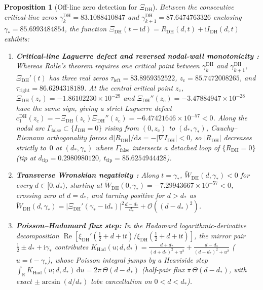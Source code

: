\documentclass[11pt,reqno]{amsart}
\newtheorem{proposition}[theorem]{Proposition}
\theoremstyle{definition}
\theoremstyle{remark}
\numberwithin{equation}{section}
\newcommand{\R}{\mathbb{R}}
\newcommand{\dd}{\mathrm{d}}
\newcommand{\ii}{\mathrm{i}}
\DeclareMathOperator{\Reop}{Re}
\begin{document}
\begin{proposition}[Off-line zero detection for $\Xi_{\mathrm{DH}}$]
\label{prop:fourfold-diagnostics}
Between the consecutive critical-line zeros $\gamma_k^{\mathrm{DH}} = 83.1088410847$ and $\gamma_{k+1}^{\mathrm{DH}} = 87.6474763326$ enclosing $\gamma_* = 85.6993484854$, the function $\Xi_{\mathrm{DH}}(t - \ii d) = R_{\mathrm{DH}}(d,t) + \ii I_{\mathrm{DH}}(d,t)$ exhibits:
\begin{enumerate}[label=\textup{(\roman*)},leftmargin=2.2em]
  \item \textbf{Critical-line Laguerre defect and reversed nodal-wall monotonicity \cite{jensen1913,csordas1994,ariasdereyna2003}:} Whereas Rolle's theorem requires one critical point between $\gamma_k^{\mathrm{DH}}$ and $\gamma_{k+1}^{\mathrm{DH}}$, $\Xi_{\mathrm{DH}}'(t)$ has \emph{three} real zeros $\tau_{\mathrm{left}} = 83.8959352522$, $z_{\mathrm{c}} = 85.7472008265$, and $\tau_{\mathrm{right}} = 86.6294318189$. At the central critical point $z_{\mathrm{c}}$, $\Xi_{\mathrm{DH}}(z_{\mathrm{c}}) = -1.86102230 \times 10^{-29}$ and $\Xi_{\mathrm{DH}}''(z_{\mathrm{c}}) = -3.47884947 \times 10^{-28}$ have the same sign, giving a strict Laguerre defect $c_1^{\mathrm{DH}}(z_{\mathrm{c}}) = -\Xi_{\mathrm{DH}}(z_{\mathrm{c}})\Xi_{\mathrm{DH}}''(z_{\mathrm{c}}) = -6.47421646 \times 10^{-57} < 0$. Along the nodal arc $\Gamma_{\mathrm{false}} \subset \{I_{\mathrm{DH}}=0\}$ rising from $(0,z_{\mathrm{c}})$ to $(d_*,\gamma_*)$, Cauchy--Riemann orthogonality forces $\dd|R_{\mathrm{DH}}|/\dd s = -|\nabla I_{\mathrm{DH}}| < 0$, so $|R_{\mathrm{DH}}|$ decreases strictly to~$0$ at $(d_*,\gamma_*)$ where $\Gamma_{\mathrm{false}}$ intersects a detached loop of $\{R_{\mathrm{DH}}=0\}$ (tip at $d_{\mathrm{tip}} = 0.2980980120$, $t_{\mathrm{tip}} = 85.6254944428$).
  \item \textbf{Transverse Wronskian negativity \cite{hinkkanen1997,lagarias1999}:} Along $t = \gamma_*$, $\widetilde{W}_{\mathrm{DH}}(d,\gamma_*) < 0$ for every $d \in [0,d_*)$, starting at $\widetilde{W}_{\mathrm{DH}}(0,\gamma_*) = -7.29943667 \times 10^{-57} < 0$, crossing zero at $d = d_*$, and turning positive for $d > d_*$ as $\widetilde{W}_{\mathrm{DH}}(d,\gamma_*) = |\Xi_{\mathrm{DH}}'(\gamma_*-\ii d_*)|^2\frac{d-d_*}{d_*} + \mathcal{O}((d-d_*)^2)$.
  \item \textbf{Poisson--Hadamard flux step:} In the Hadamard logarithmic-derivative decomposition $\Reop[\xi_{\mathrm{DH}}'(\frac{1}{2}+d+\ii t)/\xi_{\mathrm{DH}}(\frac{1}{2}+d+\ii t)]$, the mirror pair $\frac{1}{2}\pm d_* + \ii\gamma_*$ contributes $K_{\mathrm{Had}}(u;d,d_*) = \frac{d+d_*}{(d+d_*)^2+u^2} + \frac{d-d_*}{(d-d_*)^2+u^2}$ ($u = t-\gamma_*$), whose Poisson integral jumps by a Heaviside step $\int_{\R} K_{\mathrm{Had}}(u;d,d_*)\,\dd u = 2\pi\,\Theta(d - d_*)$ (half-pair flux $\pi\,\Theta(d-d_*)$, with exact $\pm\arcsin(d/d_*)$ lobe cancellation on $0 < d < d_*$).

\end{enumerate}
\end{proposition}
\end{document}
